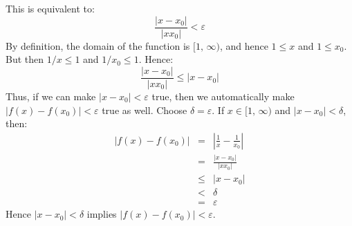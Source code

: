 \documentclass{article}
\begin{document}
    This is equivalent to:
    \begin{equation}
        \frac{\left|x-x_{0}\right|}{\left|xx_{0}\right|}
        <
        \varepsilon
    \end{equation}
    By definition, the domain of the function is $[1,\,\infty)$, and hence
    $1\leq{x}$ and $1\leq{x_{0}}$. But then
    $1/x\leq{1}$ and $1/x_{0}\leq{1}$. Hence:
    \begin{equation}
        \frac{\left|x-x_{0}\right|}{\left|xx_{0}\right|}
        \leq
        |x-x_{0}|
    \end{equation}
    Thus, if we can make $|x-x_{0}|<\varepsilon$ true, then we automatically
    make $|f(x)-f(x_{0})|<\varepsilon$ true as well.
    Choose $\delta=\varepsilon$.
    If $x\in[1,\,\infty)$ and $|x-x_{0}|<\delta$, then:
    \begin{equation}
        \begin{array}{rcl}
            \displaystyle
            \left|f(x)-f(x_{0})\right|
            \!\!
            &=&
            \!\!
            \displaystyle
            \left|
                \frac{1}{x}-\frac{1}{x_{0}}
            \right|\\[1.5em]
            \!\!
            &=&
            \!\!
            \displaystyle
            \frac{\left|x-x_{0}\right|}{\left|xx_{0}\right|}\\[1.5em]
            \!\!
            &\leq&
            \!\!
            \displaystyle
            \left|x-x_{0}\right|\\[1.5em]
            \!\!
            &<&
            \!\!
            \displaystyle
            \delta\\[1.5em]
            \!\!
            &=&
            \!\!
            \varepsilon
        \end{array}
    \end{equation}
    Hence $|x-x_{0}|<\delta$ implies $|f(x)-f(x_{0})|<\varepsilon$.
\end{document}

